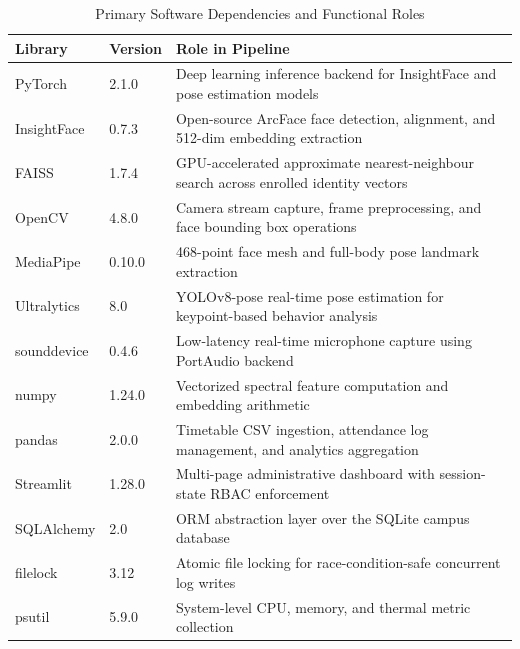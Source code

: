 \documentclass[12pt,a4paper,oneside]{report}
\begin{document}
\begin{table}[htbp]
\caption{Primary Software Dependencies and Functional Roles}
\centering
\small
{}
\setlength{\tabcolsep}{4pt}
\begin{tabular}{@{}l l p{2.8in}@{}}
\hline
\textbf{Library} & \textbf{Version} & \textbf{Role in Pipeline} \\ \hline
PyTorch & 2.1.0 & Deep learning inference backend for InsightFace and pose estimation models \\
InsightFace & 0.7.3 & Open-source ArcFace face detection, alignment, and 512-dim embedding extraction \cite{deng2019arcface} \\
FAISS & 1.7.4 & GPU-accelerated approximate nearest-neighbour search across enrolled identity vectors \\
OpenCV & 4.8.0 & Camera stream capture, frame preprocessing, and face bounding box operations \\
MediaPipe & 0.10.0 & 468-point face mesh and full-body pose landmark extraction \\
Ultralytics & 8.0 & YOLOv8-pose real-time pose estimation for keypoint-based behavior analysis \\
sounddevice & 0.4.6 & Low-latency real-time microphone capture using PortAudio backend \\
numpy & 1.24.0 & Vectorized spectral feature computation and embedding arithmetic \\
pandas & 2.0.0 & Timetable CSV ingestion, attendance log management, and analytics aggregation \\
Streamlit & 1.28.0 & Multi-page administrative dashboard with session-state RBAC enforcement \\
SQLAlchemy & 2.0 & ORM abstraction layer over the SQLite campus database \\
filelock & 3.12 & Atomic file locking for race-condition-safe concurrent log writes \\
psutil & 5.9.0 & System-level CPU, memory, and thermal metric collection \\ \hline
\end{tabular}
\label{tab:software_deps}
\end{table}
\end{document}
